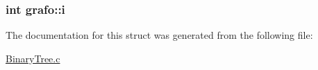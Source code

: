 \subsubsection[{\texorpdfstring{i}{i}}]{\setlength{\rightskip}{0pt plus 5cm}int grafo\+::i}\hypertarget{structgrafo_a9f3a642f8e0a5350f2a4896d3db685ee}{}\label{structgrafo_a9f3a642f8e0a5350f2a4896d3db685ee}


The documentation for this struct was generated from the following file\+:\begin{DoxyCompactItemize}
\item 
\hyperlink{BinaryTree_8c}{Binary\+Tree.\+c}\end{DoxyCompactItemize}
